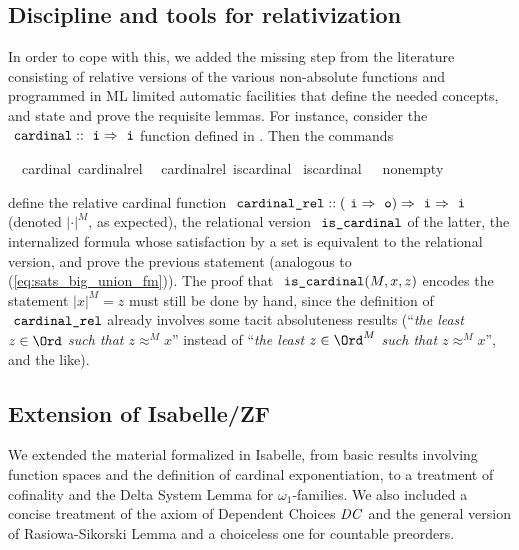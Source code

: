 \subsection{Discipline and tools for relativization}
\label{sec:tools-relativization}
In order to cope with this, we added the missing step from the
literature consisting of relative versions of the various non-absolute
functions and programmed in ML limited automatic facilities that
define the needed concepts, and  state and
prove the requisite lemmas. For instance, consider the 
$\isatt{cardinal}::\tyi \fun \tyi$ function defined in
. Then the commands
\begin{isabelle}
  \isamarkupfalse%
  \ \ {\isachardoublequoteopen}cardinal{\isachardoublequoteclose}\ {\isachardoublequoteopen}cardinal{\isacharunderscore}{\kern0pt}rel{\isachardoublequoteclose}\ \isanewline
  \isamarkupfalse%
  \ {\isachardoublequoteopen}cardinal{\isacharunderscore}{\kern0pt}rel{\isachardoublequoteclose}\ {\isachardoublequoteopen}is{\isacharunderscore}{\kern0pt}cardinal{\isachardoublequoteclose}\isanewline
  \isamarkupfalse%
  \ {\isachardoublequoteopen}is{\isacharunderscore}{\kern0pt}cardinal{\isachardoublequoteclose}\ \ \ {\isachardoublequoteopen}nonempty{\isachardoublequoteclose}%
\end{isabelle}
define the relative cardinal function
$\isatt{cardinal{\uscore}rel}::(\tyi \fun \tyo) \fun \tyi \fun\tyi$
(denoted  $|\cdot|^M$, as expected),
the relational version $\isatt{is{\uscore}cardinal}$ of the latter, the
internalized formula  whose
satisfaction by a set is equivalent to the relational version, and
prove the previous statement (analogous to (\ref{eq:sats_big_union_fm})).
The proof that $\isatt{is{\uscore}cardinal}(M,x,z)$  encodes the
statement $|x|^M = z$ must still be done by hand, since the definition
of $\isatt{cardinal{\uscore}rel}$ already involves some tacit
absoluteness results (“\textit{the least $z \in \Ord$ such that $z
  \approx^M x$}” instead
of “\textit{the least $z \in \Ord^M$ such that $z
  \approx^M x$}”, and the like).

\subsection{Extension of Isabelle/ZF}
\label{sec:extension-isabellezf}
We extended \cite{Delta_System_Lemma-AFP} the material formalized in
Isabelle, from basic results involving function spaces and the
definition of cardinal exponentiation, to a treatment of cofinality
and the Delta System Lemma for $\omega_1$-families. We also included a
concise treatment of the axiom of Dependent Choices $\mathit{DC}$ and the
general version of Rasiowa-Sikorski Lemma \cite{2018arXiv180705174G}
and a choiceless one for countable preorders.


